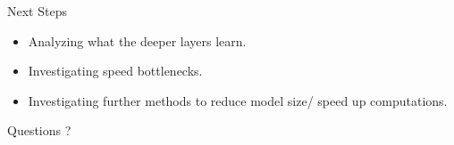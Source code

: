 \documentclass{beamer}
\begin{document}
\begin{darkframes}
    \begin{frame}{Next Steps}
    	\begin{itemize}
    		\item Analyzing what the deeper layers learn.
    		\item Investigating speed bottlenecks.
    		\item Investigating further methods to reduce model size/ speed up computations.
    	\end{itemize}
    \end{frame}
    

    \begin{frame}{Questions}
    \centering
\huge ?
    	\end{frame}
    
    
  \end{darkframes}
\end{document}

